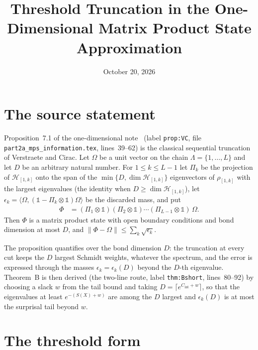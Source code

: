\documentclass{article}
\title{Threshold Truncation in the One-Dimensional Matrix Product State Approximation}
\author{}
\date{October 20, 2026}
\begin{document}
\maketitle
{}

\section{The source statement}

Proposition~7.1 of the one-dimensional note~\cite{TNLean2026OneDimensional}
(label \texttt{prop:VC}, file \texttt{part2a\_mps\_information.tex},
lines~39--62) is the classical sequential truncation of Verstraete and
Cirac. Let $\Omega$ be a unit vector on the chain $\Lambda=\{1,\ldots,L\}$
and let $D$ be an arbitrary natural number. For $1\le k\le L-1$ let
$\Pi_k$ be the projection of $\mathcal H_{[1,k]}$ onto the span of the
$\min\{D,\dim\mathcal H_{[1,k]}\}$ eigenvectors of $\rho_{[1,k]}$ with the
largest eigenvalues (the identity when $D\ge\dim\mathcal H_{[1,k]}$), let
$\epsilon_k=\langle\Omega,(\mathbb 1-\Pi_k\otimes\mathbb 1)\Omega\rangle$ be
the discarded mass, and put
\begin{align}
    \Phi
     & = (\Pi_1\otimes\mathbb 1)(\Pi_2\otimes\mathbb 1)\cdots
    (\Pi_{L-1}\otimes\mathbb 1)\,\Omega .
    \label{eq:tnlean_one_dimensional_threshold_truncation_truncated_vector}
\end{align}
Then $\Phi$ is a matrix product state with open boundary conditions and bond
dimension at most $D$, and $\|\Phi-\Omega\|\le\sum_k\sqrt{\epsilon_k}$.

The proposition quantifies over the bond dimension $D$: the truncation at
every cut keeps the $D$ largest Schmidt weights, whatever the spectrum, and
the error is expressed through the masses $\epsilon_k=\epsilon_k(D)$ beyond
the $D$-th eigenvalue. Theorem~B is then derived (the two-line route,
label \texttt{thm:Bshort}, lines~80--92) by choosing a slack $w$ from the
tail bound and taking $D=\lceil e^{C_{\mathrm{int}}+w}\rceil$, so that the
eigenvalues at least $e^{-(S(X)+w)}$ are among the $D$ largest and
$\epsilon_k(D)$ is at most the surprisal tail beyond $w$.

\section{The threshold form}
\end{document}

